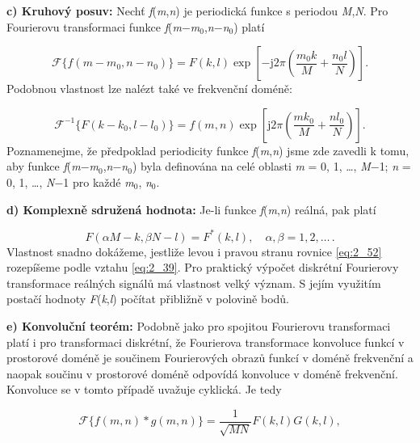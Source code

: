 \noindent \textbf{c) Kruhový posuv: }Nechť \textit{f}(\textit{m},\textit{n}) je periodická funkce s periodou \textit{M},\textit{N}. Pro Fourierovu transformaci funkce \textit{f}(\textit{m}$-$\textit{m}$_0$,\textit{n}$-$\textit{n}$_0$) platí

\begin{equation} \label{eq:2_51a}
    \mathscr{F}\{ f(m - m_0, n - n_0)\} = F(k, l) \exp \left[ - \mathrm{j} 2 \pi \left( \frac{m_0 k}{M} + \frac{n_0 l}{N}\right) \right].
\end{equation}
Podobnou vlastnost lze nalézt také ve frekvenční doméně:

\begin{equation} \label{eq:2_51b}
    \mathscr{F}^{-1}\{ F(k - k_0, l - l_0)\} = f(m, n) \exp \left[ \mathrm{j} 2 \pi \left( \frac{m k_0}{M} + \frac{n l_0}{N}\right) \right].
\end{equation}
Poznamenejme, že předpoklad periodicity funkce \textit{f}(\textit{m},\textit{n}) jsme zde zavedli k tomu, aby funkce \textit{f}(\textit{m}$-$\textit{m}$_0$,\textit{n}$-$\textit{n}$_0$)  byla definována na celé oblasti  \textit{m} = 0, 1, \dots, \textit{M}$-$1;  \textit{n} = 0, 1, \dots, \textit{N}$-$1 pro každé \textit{m}$_0$, \textit{n}$_0$.

\noindent \textbf{d) Komplexně sdružená hodnota: }Je-li funkce \textit{f}(\textit{m},\textit{n}) reálná, pak platí

\begin{equation} \label{eq:2_52}
    F(\alpha M-k, \beta N-l) = F^*(k, l), \quad \alpha, \beta = 1, 2, \dots \, .
\end{equation}
Vlastnost snadno dokážeme, jestliže levou i pravou stranu rovnice \eqref{eq:2_52} rozepíšeme podle vztahu \eqref{eq:2_39}. Pro praktický výpočet diskrétní Fourierovy transformace reálných signálů má vlastnost velký význam. S jejím využitím postačí hodnoty \textit{F}(\textit{k},\textit{l}) počítat přibližně v polovině bodů.

\noindent \textbf{e) Konvoluční teorém: }Podobně jako pro spojitou Fourierovu transformaci platí i pro transformaci diskrétní, že Fourierova transformace konvoluce funkcí v prostorové doméně je součinem Fourierových obrazů funkcí v doméně frekvenční a naopak součinu v prostorové doméně odpovídá konvoluce v doméně frekvenční. Konvoluce se v tomto případě uvažuje cyklická. Je tedy

\begin{equation} \label{eq:2_53a}
    \mathscr{F}\{ f(m, n) * g(m, n) \} = \frac{1}{\sqrt{MN}} F(k, l) G(k, l),
\end{equation}

